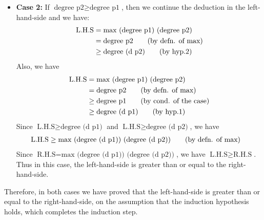 \documentclass[11pt]{article}
\theoremstyle{definition}
\begin{document}
\begin{enumerate}
\begin{enumerate}[(a)]
\begin{itemize}
\begin{itemize}
\item \textbf{Case 2: }If $\text{degree p2} \geq \text{degree p1}$, then we continue the deduction in the left-hand-side 
and we have:
\begin{align*}
\text{L.H.S} &= \text{max (degree p1) (degree p2)} \\
			 &= \text{degree p2} \tag{\text{by defn. of max}} \\
			 &\geq \text{degree (d p2)} \tag{\text{by hyp.2}}
\end{align*} 
Also, we have
\begin{align*}
\text{L.H.S} &= \text{max (degree p1) (degree p2)} \\
			 &= \text{degree p2} \tag{\text{by defn. of max}} \\
			 &\geq \text{degree p1} \tag{\text{by cond. of the case}} \\
			 &\geq \text{degree (d p1)} \tag{\text{by hyp.1}}
\end{align*}
Since $\text{L.H.S} \geq \text{degree (d p1)}$ and $\text{L.H.S} \geq \text{degree (d p2)}$, we have
\begin{align*}
\text{L.H.S} &\geq \text{max (degree (d p1)) (degree (d p2))} \tag{\text{by defn. of max}}
\end{align*}
Since $\text{R.H.S} = \text{max (degree (d p1)) (degree (d p2))}$, we have $\text{L.H.S} \geq \text{R.H.S}$. Thus in this case, the left-hand-side is greater than or equal to the right-hand-side.
\end{itemize}
Therefore, in both cases we have proved that the left-hand-side is greater than or equal to the right-hand-side,
on the assumption that the induction hypothesis holds, which completes the induction step.
\end{itemize}


\end{enumerate}
\end{enumerate}
\end{document}
